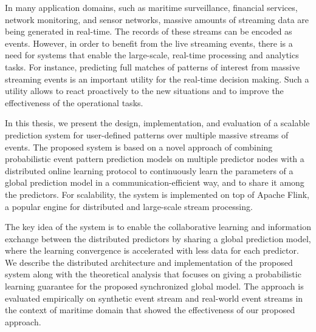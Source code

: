 
\par In many application domains, such as maritime surveillance, financial services, network monitoring, and sensor networks, massive amounts of streaming data are being generated in real-time. The records of these streams can be encoded as events. However, in order to benefit from the live streaming events, there is a need for systems that enable the large-scale, real-time processing and analytics tasks. For instance, predicting full matches of patterns of interest from massive streaming events is an important utility for the real-time decision making. Such a utility allows to react proactively to the new situations and to improve the effectiveness of the operational tasks.

\par In this thesis, we present the design, implementation, and evaluation of a scalable prediction system for user-defined patterns over multiple massive streams of events. The proposed system is based on a novel approach of combining probabilistic event pattern prediction models on multiple predictor nodes with a distributed online learning protocol to continuously learn the parameters of a global prediction model in a communication-efficient way, and to share it among the predictors. For  scalability, the system is implemented on top of Apache Flink, a popular engine for distributed and large-scale stream processing.



\par  The key idea of the system is to enable the collaborative learning and information exchange between the distributed predictors by sharing a global prediction model, where the learning convergence is accelerated with less data for each predictor. We describe the distributed architecture and implementation of the proposed system along with the theoretical analysis that focuses on giving a probabilistic learning guarantee for the proposed synchronized global model.
The approach is evaluated empirically on synthetic event stream and real-world event streams in the context of maritime domain that showed the effectiveness of our proposed approach.



